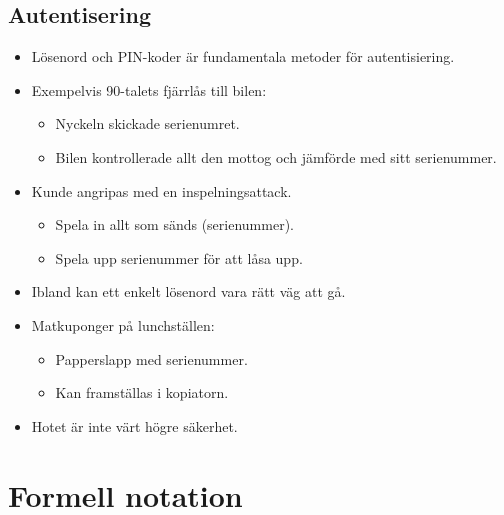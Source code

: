\documentclass{beamer}
\theoremstyle{definition}
\theoremstyle{remark}
\begin{document}
\subsection{Autentisering}

\begin{frame}
  \begin{itemize}
    \item Lösenord och PIN-koder är fundamentala metoder för autentisiering.

    \item Exempelvis 90-talets fjärrlås till bilen:
      \begin{itemize}
        \item Nyckeln skickade serienumret.
        \item Bilen kontrollerade allt den mottog och jämförde med sitt 
          serienummer.
      \end{itemize}

    \item Kunde angripas med en inspelningsattack.
      \begin{itemize}
        \item Spela in allt som sänds (serienummer).
        \item Spela upp serienummer för att låsa upp.
      \end{itemize}

  \end{itemize}
\end{frame}

\begin{frame}
  \begin{itemize}
    \item Ibland kan ett enkelt lösenord vara rätt väg att gå.

    \item Matkuponger på lunchställen:
      \begin{itemize}
        \item Papperslapp med serienummer.
        \item Kan framställas i kopiatorn.
      \end{itemize}

    \item Hotet är inte värt högre säkerhet.

  \end{itemize}
\end{frame}


\section{Formell notation}
\end{document}
